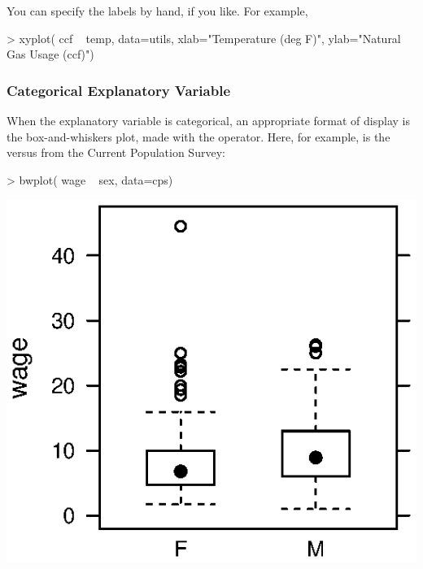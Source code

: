 You can specify the labels by hand, if you like.  For example, 
\begin{Schunk}
\begin{Sinput}
> xyplot( ccf ~ temp, data=utils, 
      xlab="Temperature (deg F)",
      ylab="Natural Gas Usage (ccf)")
\end{Sinput}
\end{Schunk}


\subsubsection{Categorical Explanatory Variable}

When the explanatory variable is categorical, an appropriate format of
display is the box-and-whiskers plot, made with the 
operator.   Here, for example, is the
 versus  from the Current Population Survey:
\begin{Schunk}
\begin{Sinput}
> bwplot( wage ~ sex, data=cps)
\end{Sinput}
\end{Schunk}
\includegraphics{Figures/language-box1}

